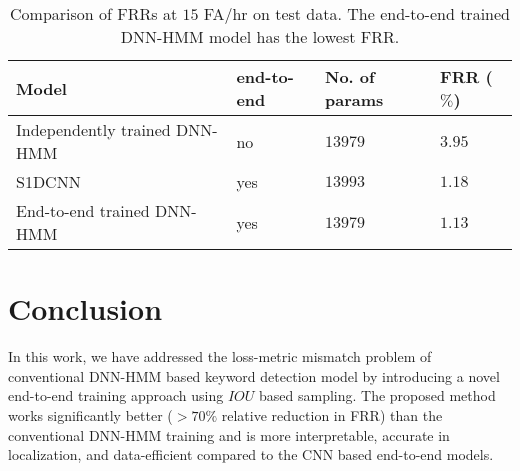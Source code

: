 \documentclass{article}
\begin{document}
\begin{table}[!ht]
    \centering
    \begin{tabular}{@{}C{4.5cm}|C{1cm}|C{1.0cm}|C{0.8cm}@{}}
\toprule[0.015in]
         Model & end-to-end & No. of params   &  FRR ($\%$)\\
         \midrule
         Independently trained DNN-HMM & no &  $13979$  &  $3.95$\\ \midrule
         S1DCNN~\cite{Higuchi2020} & yes & $13993$  &  $1.18$\\ \midrule
         End-to-end trained DNN-HMM & yes & $13979$  &$\mathbf {1.13}$ \\
         \bottomrule
    \end{tabular}
    \vspace{-0.1in}
    \caption{Comparison of FRRs at $15$ FA/hr on test data.
     The end-to-end trained DNN-HMM model has the lowest FRR.}
    \label{tab:ModelComparison}
    \vspace{-0.1in}
\end{table}

 
\section{Conclusion}
In this work, we have addressed the loss-metric mismatch problem of conventional DNN-HMM based keyword detection model by introducing a novel end-to-end training approach using $IOU$ based sampling.
The proposed method works significantly better ($> 70\%$ relative reduction in FRR) than the conventional DNN-HMM training and is more interpretable, accurate in localization, and data-efficient compared to the CNN based end-to-end models.
 
\end{document}
